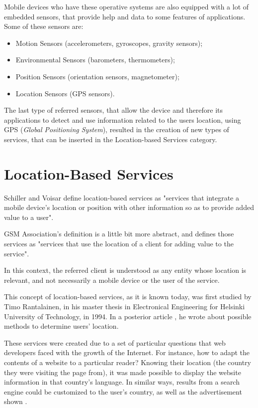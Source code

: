 Mobile devices who have these operative systems are also equipped with a lot of embedded sensors, that provide help and data to some features of applications. Some of these sensors are:

\begin{itemize}
\item Motion Sensors (accelerometers, gyroscopes, gravity sensors);
\item Environmental Sensors (barometers, thermometers);
\item Position Sensors (orientation sensors, magnetometer);
\item Location Sensors (GPS sensors).
\end{itemize}

The last type of referred sensors, that allow the device and therefore its applications to detect and use information related to the users location, using GPS (\emph{Global Positioning System}), resulted in the creation of new types of services, that can be inserted in the Location-based Services category.

\section{Location-Based Services}\label{sec:lbs}

Schiller and Voisar \cite{kn:SV04} define location-based services as "services that integrate a mobile device's location or position with other information so as to provide added value to a user". 

GSM Association's definition is a little bit more abstract, and defines those services as "services that use the location of a client for adding value to the service".

In this context, the referred client is understood as any entity whose location is relevant, and not necessarily a mobile device or the user of the service.

This concept of location-based services, as it is known today, was first studied by Timo Rantalainen, in his master thesis in Electronical Engineering for Helsinki University of Technology, in 1994. In a posterior article \cite{kn:SR95}, he wrote about possible methods to determine users' location.

These services were created due to a set of particular questions that web developers faced with the growth of the Internet. For instance, how to adapt the contents of a website to a particular reader? Knowing their location (the country they were visiting the page from), it was made possible to display the website information in that country's language. In similar ways, results from a search engine could be customized to the user's country, as well as the advertisement shown \cite{kn:BWD11}.

